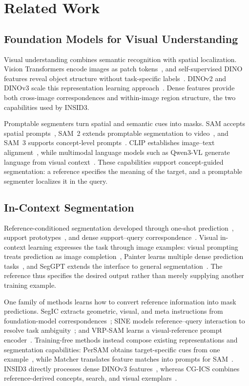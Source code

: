 \section{Related Work}
\subsection{Foundation Models for Visual Understanding}
Visual understanding combines semantic recognition with spatial localization. Vision Transformers encode images as patch tokens~\cite{vit}, and self-supervised DINO features reveal object structure without task-specific labels~\cite{dino}. DINOv2 and DINOv3 scale this representation learning approach~\cite{dinov2,dinov3}. Dense features provide both cross-image correspondences and within-image region structure, the two capabilities used by INSID3.

Promptable segmenters turn spatial and semantic cues into masks. SAM accepts spatial prompts~\cite{sam}, SAM~2 extends promptable segmentation to video~\cite{sam2}, and SAM~3 supports concept-level prompts~\cite{sam3}. CLIP establishes image--text alignment~\cite{clip}, while multimodal language models such as Qwen3-VL generate language from visual context~\cite{qwen3vl}. These capabilities support concept-guided segmentation: a reference specifies the meaning of the target, and a promptable segmenter localizes it in the query.

\subsection{In-Context Segmentation}
Reference-conditioned segmentation developed through one-shot prediction~\cite{oslsm}, support prototypes~\cite{panet}, and dense support--query correspondence~\cite{hsnet}. Visual in-context learning expresses the task through image examples: visual prompting treats prediction as image completion~\cite{visualprompt}, Painter learns multiple dense prediction tasks~\cite{painter}, and SegGPT extends the interface to general segmentation~\cite{seggpt}. The reference thus specifies the desired output rather than merely supplying another training example.

One family of methods learns how to convert reference information into mask predictions. SegIC extracts geometric, visual, and meta instructions from foundation-model correspondences~\cite{segic}; SINE models reference--query interaction to resolve task ambiguity~\cite{sine}; and VRP-SAM learns a visual-reference prompt encoder~\cite{vrpsam}. Training-free methods instead compose existing representations and segmentation capabilities: PerSAM obtains target-specific cues from one example~\cite{persam}, while Matcher translates feature matches into prompts for SAM~\cite{matcher}. INSID3 directly processes dense DINOv3 features~\cite{insid3}, whereas CG-ICS combines reference-derived concepts, search, and visual exemplars~\cite{cgics}.

